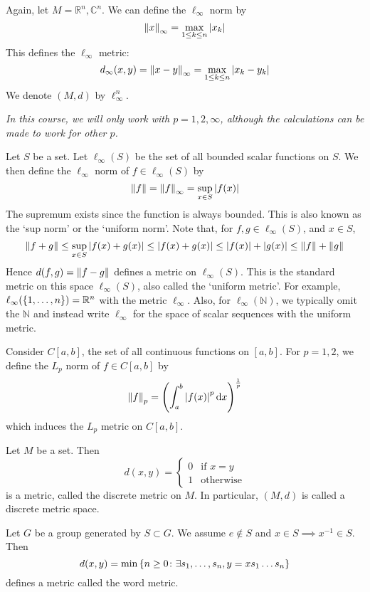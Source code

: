 \begin{example}
	Again, let \( M = \mathbb R^n, \mathbb C^n \).
	We can define the \( \ell_\infty \) norm by
	\[
		\norm{x}_\infty = \max_{1 \leq k \leq n} \abs{x_k}
	\]
	This defines the \( \ell_\infty \) metric:
	\[
		d_\infty(x,y) = \norm{x-y}_\infty = \max_{1 \leq k \leq n} \abs{x_k - y_k}
	\]
	We denote \( (M, d) \) by \( \ell_\infty^n \).
\end{example}
\noindent \textit{In this course, we will only work with \( p = 1, 2, \infty \), although the calculations can be made to work for other \( p \).}
\begin{example}
	Let \( S \) be a set.
	Let \( \ell_\infty(S) \) be the set of all bounded scalar functions on \( S \).
	We then define the \( \ell_\infty \) norm of \( f \in \ell_\infty(S) \) by
	\[
		\norm{f} = \norm{f}_\infty = \sup_{x \in S} \abs{f(x)}
	\]
	The supremum exists since the function is always bounded.
	This is also known as the `sup norm' or the `uniform norm'.
	Note that, for \( f,g \in \ell_\infty(S) \), and \( x \in S \),
	\[
		\norm{f+g} \leq \sup_{x \in S} \abs{f(x) + g(x)} \leq \abs{f(x) + g(x)} \leq \abs{f(x)} + \abs{g(x)} \leq \norm{f} + \norm{g}
	\]
	Hence \( d(f,g) =\norm{f-g} \) defines a metric on \( \ell_\infty(S) \).
	This is the standard metric on this space \( \ell_\infty(S) \), also called the `uniform metric'.
	For example, \( \ell_\infty(\qty{1, \dots, n}) = \mathbb R^n \) with the metric \( \ell_\infty \).
	Also, for \( \ell_\infty(\mathbb N) \), we typically omit the \( \mathbb N \) and instead write \( \ell_\infty \) for the space of scalar sequences with the uniform metric.
\end{example}
\begin{example}
	Consider \( C[a,b] \), the set of all continuous functions on \( [a,b] \).
	For \( p = 1,2 \), we define the \( L_p \) norm of \( f \in C[a,b] \) by
	\[
		\norm{f}_p = \qty( \int_a^b \abs{f(x)}^p \dd{x} )^{\frac{1}{p}}
	\]
	which induces the \( L_p \) metric on \( C[a,b] \).
\end{example}
\begin{example}
	Let \( M \) be a set.
	Then
	\[
		d(x,y) = \begin{cases}
			0 & \text{if } x = y \\
			1 & \text{otherwise}
		\end{cases}
	\]
	is a metric, called the discrete metric on \( M \).
	In particular, \( (M, d) \) is called a discrete metric space.
\end{example}
\begin{example}
	Let \( G \) be a group generated by \( S \subset G \).
	We assume \( e \not\in S \) and \( x \in S \implies x^{-1} \in S \).
	Then
	\[
		d(x,y) = \min \qty{ n \geq 0 \colon \exists s_1, \dots, s_n, y = x s_1 \dots s_n }
	\]
	defines a metric called the word metric.
\end{example}
